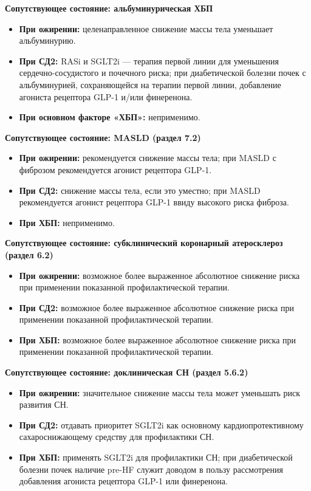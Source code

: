 \documentclass[11pt,a4paper]{article}
\newcommand{\heading}[1]{\par\medskip\textbf{#1}\par}
\begin{document}
\heading{Сопутствующее состояние: альбуминурическая ХБП}
\begin{itemize}
\item \textbf{При ожирении:} целенаправленное снижение массы тела уменьшает альбуминурию.
\item \textbf{При СД2:} RASi и SGLT2i --- терапия первой линии для уменьшения сердечно-сосудистого и почечного риска; при диабетической болезни почек с альбуминурией, сохраняющейся на терапии первой линии, добавление агониста рецептора GLP-1 и/или финеренона.
\item \textbf{При основном факторе «ХБП»:} неприменимо.
\end{itemize}

\heading{Сопутствующее состояние: MASLD (раздел 7.2)}
\begin{itemize}
\item \textbf{При ожирении:} рекомендуется снижение массы тела; при MASLD с фиброзом рекомендуется агонист рецептора GLP-1.
\item \textbf{При СД2:} снижение массы тела, если это уместно; при MASLD рекомендуется агонист рецептора GLP-1 ввиду высокого риска фиброза.
\item \textbf{При ХБП:} неприменимо.
\end{itemize}

\heading{Сопутствующее состояние: субклинический коронарный атеросклероз (раздел 6.2)}
\begin{itemize}
\item \textbf{При ожирении:} возможное более выраженное абсолютное снижение риска при применении показанной профилактической терапии.
\item \textbf{При СД2:} возможное более выраженное абсолютное снижение риска при применении показанной профилактической терапии.
\item \textbf{При ХБП:} возможное более выраженное абсолютное снижение риска при применении показанной профилактической терапии.
\end{itemize}

\heading{Сопутствующее состояние: доклиническая СН (раздел 5.6.2)}
\begin{itemize}
\item \textbf{При ожирении:} значительное снижение массы тела может уменьшать риск развития СН.
\item \textbf{При СД2:} отдавать приоритет SGLT2i как основному кардиопротективному сахароснижающему средству для профилактики СН.
\item \textbf{При ХБП:} применять SGLT2i для профилактики СН; при диабетической болезни почек наличие pre-HF служит доводом в пользу рассмотрения добавления агониста рецептора GLP-1 или финеренона.
\end{itemize}
\end{document}
